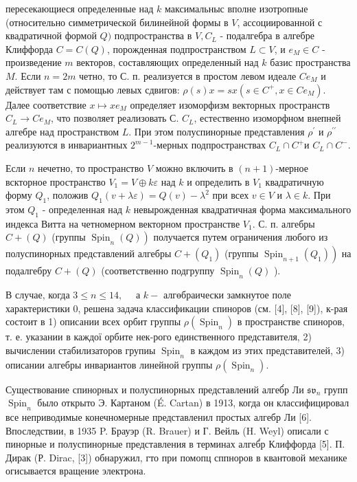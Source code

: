 \documentclass[10pt]{article}
\begin{document}
пересекающиеся определенные над $k$ максимальныс вполне изотропные (относительно симметрической билинейной формы в $V$, ассоциированной с квадратичной формой $Q)$ подпространства в $V, C_{L}$ - подалгебра в алгебре Клиффорда $C=C(Q)$, порожденная подпространством $L \subset V$, и $e_{M} \in C$ - произведение $m$ векторов, составляющих определенный над $k$ базис пространства $M$. Если $n=2 m$ четно, то С. п. реализуется в простом левом идеале $C e_{M}$ и действует там с помощью левых сдвигов: $\rho(s) x=s x\left(s \in C^{+}, x \in C e_{M}\right)$. Далее соответствие $x \mapsto x e_{M}$ определяет изоморфизм векторных пространств $C_{L} \rightarrow C e_{M}$, что позволяет реализовать С. $C_{L}$, естественно изоморфном внепней алгебре над пространством $L$. При этом полуспинорные представления $\rho^{\prime}$ и $\rho^{\prime \prime}$ реализуются в инвариантных $2^{m-1}$-мерных подпространствах $C_{L} \cap C^{+}$и $C_{L} \cap C^{-}$.



Если $n$ нечетно, то пространство $V$ можно включить в $(n+1)$-мерное вскторное пространство $V_{1}=V \oplus k \varepsilon$ над $k$ и определить в $V_{1}$ квадратичную форму $Q_{1}$, положив $Q_{1}(v+\lambda \varepsilon)=Q(v)-\lambda^{2}$ при всех $v \in V$ и $\lambda \in k$. При этом $Q_{1}$ - определенная над $k$ невырожденная квадратичная форма максимального индекса Витта на четномерном векторном пространстве $V_{1}$. С. п. алгебры $C+(Q)$ (группы $\left.\operatorname{Spin}_{n}(Q)\right)$ получается путем ограничения любого из полуспинорных представлений алгебры $C+\left(Q_{1}\right)$ (группы $\left.\operatorname{Spin}_{n+1}\left(Q_{1}\right)\right)$ на подалгебру $C+(Q)$ (соответственно подгруппу $\operatorname{Spin}_{n}(Q)$ ).



В случае, когда $3 \leqslant n \leqslant 14, \quad$ а $k-$ алгөбраически замкнутое поле характеристики 0, решена задача классификации спиноров (см. [4], [8], [9]), к-рая состоит в 1) описании всех орбит группы $\rho\left(\operatorname{Spin}_{n}\right)$ в пространстве спиноров, т. е. указании в каждої орбите нек-рого единственного представителя, 2) вычислении стабилизаторов групиы $\operatorname{Spin}_{n}$ в каждом из этих представителей, 3) описании алгебры инвариантов линейной группы $\rho\left(\operatorname{Spin}_{n}\right)$.



Существование спинорных и полуспинорных представлений алгеб́р Ли $\mathfrak{s v}_{n}$ групп $\operatorname{Spin}_{n}$ было открыто Э. Картаном (É. Cartan) в 1913, когда он классифицировал все неприводимые конечномерные представленил простых алгебр Ли [6]. Впоследствии, в 1935 P. Брауэр (R. Brauer) и Г. Вейль (H. Weyl) описали с пинорные и полуспинорные представления в терминах алгеб́р Клиффорда [5]. П. Дирак (Р. Dirac, [3]) обнаружил, гто при помопц сппноров в квантовой механике огисывается вращение электрона.
\end{document}
